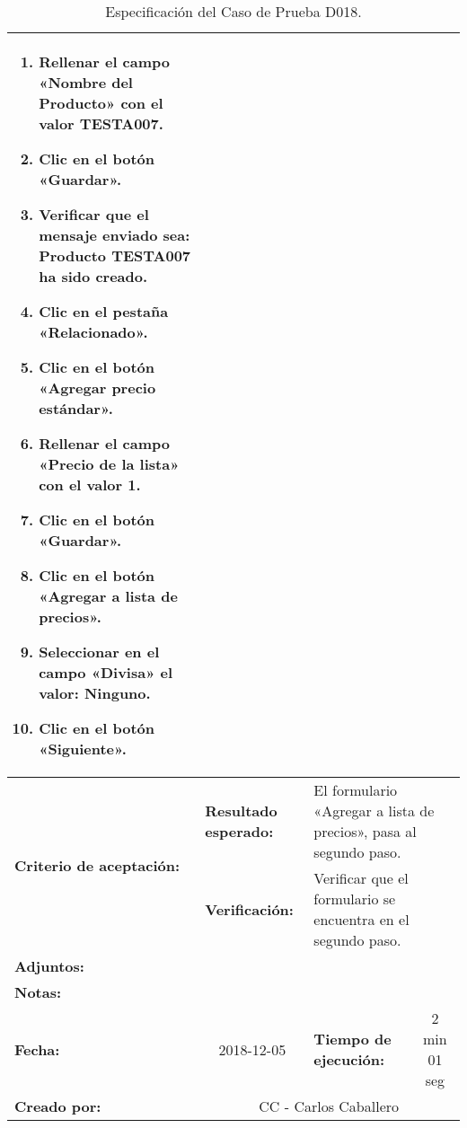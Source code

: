 \begin{table}[H]
\begin{tabular}{|p{2.5cm}|p{2.8cm}|p{2.2cm}|p{2.8cm}|p{2.2cm}|}
{{\begin{enumerate}
\item Rellenar el campo «Nombre del Producto» con el valor \textbf{TESTA007}.
\item Clic en el botón «Guardar».
\item Verificar que el mensaje enviado sea:
    \textbf{Producto TESTA007 ha sido creado}.
\item Clic en el pestaña «Relacionado».
\item Clic en el botón «Agregar precio estándar».
\item Rellenar el campo «Precio de la lista» con el valor \textbf{1}.
\item Clic en el botón «Guardar».
\item Clic en el botón «Agregar a lista de precios».
\item Seleccionar en el campo «Divisa» el valor: \textbf{Ninguno}.
\item Clic en el botón «Siguiente».
\end{enumerate}
}} \\
\hline
\multirow{2}{2.8cm}{\footnotesize{\textbf{Criterio de aceptación:}}} &
\footnotesize{\textbf{Resultado esperado:}} &
\multicolumn{3}{p{9.1cm}|}{\footnotesize{El formulario «Agregar a lista de
precios», pasa al segundo paso.}} \\
\cline{2-5}
& \footnotesize{\textbf{Verificación:}} &
\multicolumn{3}{p{9.1cm}|}{\footnotesize{Verificar que el formulario se
encuentra en el segundo paso.}} \\
\hline
\footnotesize{\textbf{Adjuntos:}} &
\multicolumn{4}{p{12.4cm}|}{\footnotesize{}} \\
\hline
\footnotesize{\textbf{Notas:}} &
\multicolumn{4}{p{12.4cm}|}{\footnotesize{}} \\
\hline
\footnotesize{\textbf{Fecha:}} &
\multicolumn{1}{c|}{\footnotesize{2018-12-05}} &
\multicolumn{2}{l|}{\footnotesize{\textbf{Tiempo de ejecución:}}} &
\multicolumn{1}{c|}{\footnotesize{2 min 01 seg}} \\
\hline
\footnotesize{\textbf{Creado por:}} &
\multicolumn{4}{c|}{\footnotesize{CC - Carlos Caballero}} \\
\hline
\end{tabular}
\caption{Especificación del Caso de Prueba D018.}
\label{tcd018}
\end{table}

